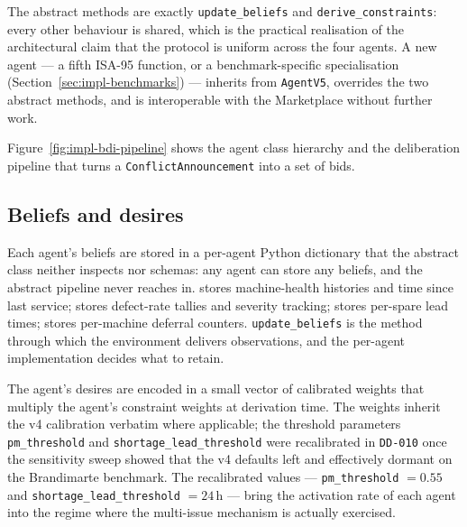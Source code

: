 The abstract methods are exactly \texttt{update\_beliefs} and
\texttt{derive\_constraints}: every other behaviour is shared, which is
the practical realisation of the architectural claim that the protocol
is uniform across the four agents. A new agent --- a fifth ISA-95
function, or a benchmark-specific specialisation
(Section~\ref{sec:impl-benchmarks}) --- inherits from \texttt{AgentV5},
overrides the two abstract methods, and is interoperable with the
Marketplace without further work.

Figure~\ref{fig:impl-bdi-pipeline} shows the agent class hierarchy and
the deliberation pipeline that turns a \texttt{ConflictAnnouncement}
into a set of bids.


\subsection{Beliefs and desires}

Each agent's beliefs are stored in a per-agent Python dictionary that
the abstract class neither inspects nor schemas: any agent can store
any beliefs, and the abstract pipeline never reaches in. \PMA{} stores
machine-health histories and time since last service; \QCA{} stores
defect-rate tallies and severity tracking; \SCA{} stores per-spare lead
times; \PSA{} stores per-machine deferral counters. \texttt{update\_beliefs}
is the method through which the environment delivers observations, and
the per-agent implementation decides what to retain.

The agent's desires are encoded in a small vector of calibrated weights
that multiply the agent's constraint weights at derivation time. The
weights inherit the v4 calibration verbatim where applicable; the
threshold parameters \texttt{pm\_threshold} and
\texttt{shortage\_lead\_threshold} were recalibrated in \texttt{DD-010}
once the sensitivity sweep showed that the v4 defaults left \PMA{} and
\SCA{} effectively dormant on the Brandimarte benchmark. The recalibrated
values --- \texttt{pm\_threshold} $= 0.55$ and
\texttt{shortage\_lead\_threshold} $= 24\,\text{h}$ --- bring the
activation rate of each agent into the regime where the multi-issue
mechanism is actually exercised.

